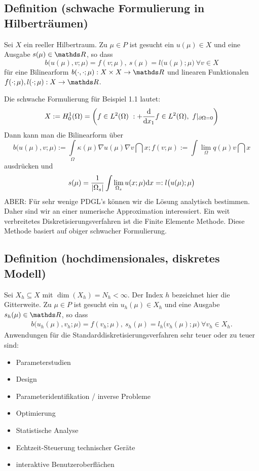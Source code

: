 \subsection{Definition (schwache Formulierung in Hilberträumen)}
\label{sub:def_hilbert}
Sei $X$ ein reeller Hilbertraum.
Zu $\mu\in P$ ist gesucht ein $u(\mu)\in X$ und eine Ausgabe $s(\mu)\in \R$, so dass
\[
b\big(u(\mu),v;\mu\big) = f(v;\mu), ~ s(\mu) = l\big(u(\mu);\mu\big)~\forall v\in X
\]
für eine Bilinearform $b(\cdot,\cdot;\mu): X\times X \to \R$ und linearen Funktionalen $f(\cdot;\mu),l(\cdot;\mu):X\to \R$.

Die schwache Formulierung für Beispiel 1.1 lautet:
\[
X:= H_0^1(\Omega)= \left( f\in L^2(\Omega)~:+\frac{\mathrm{d}  }{\mathrm{d} x_1} f\in L^2(\Omega),~f|_{\partial \Omega = 0}\right)
\]
Dann kann man die Bilinearform über
\[
b\big(u(\mu),v;\mu\big) := \int\limits_{\Omega} \kappa(\mu)\nabla u(\mu)\nabla v \dint x; f(v;\mu) := \int\lim\limits_{\Omega} q(\mu) v \dint x
\]
ausdrücken und 
\[
s(\mu) = \frac{1}{\left\vert\Omega_s\right\vert} \int\lim\limits_{\Omega_s} u(x;\mu)\mathrm{d} x =: l\big(u(\mu);\mu\big)
\]
ABER: Für sehr wenige PDGL's können wir die Lösung analytisch bestimmen.
Daher sind wir an einer numerische Approximation interessiert.
Ein weit verbreitetes Diskretisierungsverfahren ist die Finite Elemente Methode.
Diese Methode basiert auf obiger schwacher Formulierung.

\subsection{Definition (hochdimensionales, diskretes Modell)}
\label{sub:def_hochdim}
Sei $X_h\subseteq X$ mit $\dim(X_h) =N_h < \infty$.
Der Index $h$ bezeichnet hier die Gitterweite.
Zu $\mu\in P$ ist gesucht ein $u_h(\mu)\in X_h$ und eine Ausgabe $s_h(\mu)\in \R$, so dass
\begin{align}
b\big(u_h(\mu),v_h;\mu\big) = f(v_h;\mu), ~ s_h(\mu)= l_h\big(v_h(\mu);\mu\big)~\forall v_h\in X_h.
\end{align}
Anwendungen für die Standarddiskretisierungsverfahren sehr teuer oder zu teuer sind:
\begin{itemize}
	\item Parameterstudien
	\item Design
	\item Parameteridentifikation / inverse Probleme
	\item Optimierung
	\item Statistische Analyse
\end{itemize}
\begin{itemize}
	\item Echtzeit-Steuerung technischer Geräte
	\item interaktive Benutzeroberflächen
\end{itemize}

